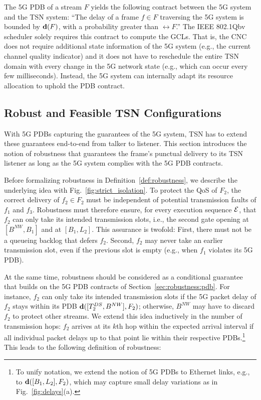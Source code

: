 The 5G PDB of a stream $F$ yields the following contract between the 5G system and the TSN system:
``The delay of a frame $f \in F$ traversing the 5G system is bounded by $\dpdb{F}$, with a probability greater than $\rel{F}$.''
The IEEE 802.1Qbv scheduler solely requires this contract to compute the GCLs.
That is, the CNC does not require additional state information of the 5G system (e.g., the current channel quality indicator) and it does not have to reschedule the entire TSN domain with every change in the 5G network state (e.g., which can occur every few milliseconds).
Instead, the 5G system can internally adapt its resource allocation to uphold the PDB contract.

\subsection{Robust and Feasible TSN Configurations} \label{sec:robustness}
With 5G PDBs capturing the guarantees of the 5G system, TSN has to extend these guarantees end-to-end from talker to listener.
This section introduces the notion of robustness that guarantees the frame's punctual delivery to its TSN listener as long as the 5G system complies with the 5G PDB contracts.



Before formalizing robustness in Definition~\ref{def:robustness}, we describe the underlying idea with Fig.~\ref{fig:strict_isolation}.
To protect the QoS of $F_2$, the correct delivery of $f_2 \in F_2$ must be independent of potential transmission faults of $f_1$ and $f_3$.
Robustness must therefore ensure, for every execution sequence $\mathcal{E}$, that $f_2$ can only take its intended transmission slots, i.e., the second gate opening at $[B^{NW}, B_1]$ and at $[B_1,L_2]$.
This assurance is twofold: 
First, there must not be a queueing backlog that defers $f_2$.
Second, $f_2$ may never take an earlier transmission slot, even if the previous slot is empty (e.g., when $f_1$ violates its 5G PDB).

At the same time, robustness should be considered as a conditional guarantee that builds on the 5G PDB contracts of Section~\ref{sec:robustness:pdb}.
For instance, $f_2$ can only take its intended transmission slots if the 5G packet delay of $f_2$ stays within its PDB $\dpdb{[T_2^{DS}, B^{NW}], F_2}$;
otherwise, $B^{NW}$ may have to discard $f_2$ to protect other streams.
We extend this idea inductively in the number of transmission hops:
$f_2$ arrives at its $k$th hop within the expected arrival interval if all individual packet delays up to that point lie within their respective PDBs.\footnote{To unify notation, we extend the notion of 5G PDBs to Ethernet links, e.g., to $\dpdb{[B_1, L_2], F_2}$, which may capture small delay variations as in Fig.~\ref{fig:delays}(a).}
This leads to the following definition of robustness:

